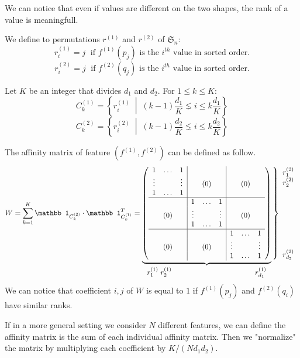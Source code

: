 \documentclass[a4paper]{article}
\begin{document}
  We can notice that even if values are different on the two shapes, the rank of a value is meaningfull. 
  
  \newpage
  
  We define to permutations $r^{(1)}$ and $r^{(2)}$ of $\mathfrak S_n$:
  \[r^{(1)}_i = j \;\text{ if }f^{(1)}(p_j)\text{ is the }i^{th}\text{ value in sorted order.}\]
  \[r^{(2)}_i = j \;\text{ if }f^{(2)}(q_j)\text{ is the }i^{th}\text{ value in sorted order.}\]
  
  \medskip Let $K$ be an integer that divides $d_1$ and $d_2$. For $1 \leq k \leq K$:
  \[C_k^{(1)} = \left\{r^{(1)}_i \;\middle|\; (k-1)\frac{d_1}{K} \lneq i \leq k\frac{d_1}{K} \right\}\]
  \[C_k^{(2)} = \left\{r^{(2)}_i \;\middle|\; (k-1)\frac{d_2}{K} \lneq i \leq k\frac{d_2}{K} \right\}\]

The affinity matrix of feature $(f^{(1)}, f^{(2)})$ can be defined as follow.
\[W = \sum_{k=1}^K \mathbb 1_{C^{(2)}_k} \cdot \mathbb 1_{C^{(1)}_k}^T = \underbrace{\left(\begin{array}{ccc|ccc|ccc}
1 & \dots & 1 & && & && \\
\vdots & & \vdots & &(0)& & &(0)& \\
1 & \dots & 1 & && & && \\\hline
&& & 1 & \dots & 1 & &&\\
&(0)& & \vdots & & \vdots & &(0)&\\
&& & 1 & \dots & 1 & &&\\\hline
&& & && & 1 & \dots & 1\\
&(0)& & &(0)& & \vdots && \vdots\\
&& & && & 1 & \dots & 1\\
\end{array}\right)}_{\displaystyle r^{(1)}_1 \; r^{(1)}_2 \hspace{4cm} r^{(1)}_{d_1}}\left\}\begin{array}{c}r^{(2)}_1\\r^{(2)}_2\\\\\\\\\\\\\\\\r^{(2)}_{d_2}\end{array}\right.\]
We can notice that coefficient $i,j$ of $W$ is equal to $1$ if $f^{(1)}(p_j)$ and $f^{(2)}(q_i)$ have similar ranks.

  \medskip If in a more general setting we consider $N$ different features, we can define the affinity matrix is the sum of each individual affinity matrix. Then we "normalize" the matrix by multiplying each coefficient by $K/(Nd_1d_2)$.
  
\end{document}
